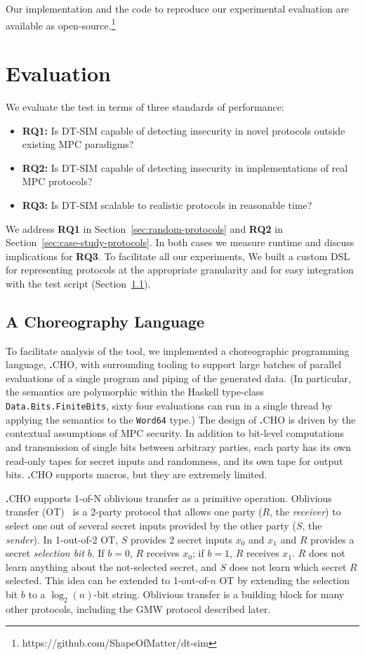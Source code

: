 \documentclass[compsoc, conference, a4paper, 10pt, times]{IEEEtran}
\newcommand{\langname}{\textsc{\textbf{.}CHO}\xspace}
\newcommand{\toolname}{\textsc{DT-SIM}\xspace}
\begin{document}
Our implementation and the code to reproduce our experimental evaluation are available as open-source.\footnote{https://github.com/ShapeOfMatter/dt-sim}


\section{Evaluation}

We evaluate the test in terms of three standards of performance:
\begin{itemize}
\item \textbf{RQ1:} Is \toolname capable of detecting insecurity in novel protocols outside existing MPC paradigms?
\item \textbf{RQ2:} Is \toolname capable of detecting insecurity in implementations of real MPC protocols?
\item \textbf{RQ3:} Is \toolname scalable to realistic protocols in reasonable time?
\end{itemize}
We address \textbf{RQ1} in Section~\ref{sec:random-protocols}
and \textbf{RQ2} in Section~\ref{sec:case-study-protocols}.
In both cases we measure runtime and discuss implications for \textbf{RQ3}.
To facilitate all our experiments,
We built a custom DSL for representing protocols at the appropriate granularity and for easy integration with the test script
(Section~\ref{sec:cho-lang}).


\subsection{A Choreography Language}
\label{sec:cho-lang}

To facilitate analysis of the tool, we implemented a choreographic programming language, \langname,
with surrounding tooling to support large batches of parallel evaluations of a single program and piping of the generated data.
(In particular, the semantics are polymorphic within the Haskell type-class \texttt{Data.Bits.FiniteBits},
\eg{} sixty four evaluations can run in a single thread by applying the semantics to the \texttt{Word64} type.)
The design of \langname is driven by the contextual assumptions of MPC security.
In addition to bit-level computations and transmission of single bits between arbitrary parties,
each party has its own read-only tapes for secret inputs and randomness,
and its own tape for output bits.
\langname supports macros, but they are extremely limited.

\langname supports 1-of-N oblivious transfer as a primitive operation.
Oblivious transfer (OT)~\cite{kilian1988founding} is a 2-party protocol that allows one party ($R$, the \emph{receiver}) to select one out of several secret inputs provided by the other party ($S$, the \emph{sender}). In 1-out-of-2 OT, $S$ provides 2 secret inputs $x_0$ and $x_1$ and $R$ provides a secret \emph{selection bit} $b$. If $b=0$, $R$ receives $x_0$; if $b=1$, $R$ receives $x_1$. $R$ does not learn anything about the not-selected secret, and $S$ does not learn which secret $R$ selected. This idea can be extended to 1-out-of-$n$ OT by extending the selection bit $b$ to a $\log_2(n)$-bit string.
%
Oblivious transfer is a building block for many other protocols, including the GMW protocol described later.
\end{document}
